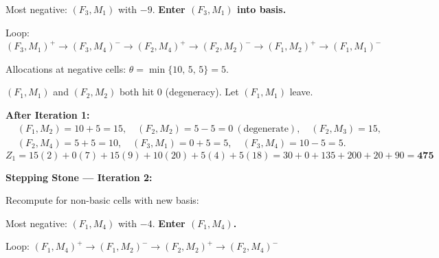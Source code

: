 \documentclass[12pt]{article}
\begin{document}
\begin{ansbox}
Most negative: $(F_3,M_1)$ with $-9$. \textbf{Enter $(F_3,M_1)$ into basis.}

Loop: $(F_3,M_1)^+\to(F_3,M_4)^-\to(F_2,M_4)^+\to(F_2,M_2)^-\to(F_1,M_2)^+\to(F_1,M_1)^-$

Allocations at negative cells: $\theta = \min\{10,\,5,\,5\} = 5$.

$(F_1,M_1)$ and $(F_2,M_2)$ both hit 0 (degeneracy). Let $(F_1,M_1)$ leave.

\textbf{After Iteration 1:}
\begin{align*}
  &(F_1,M_2)=10+5=15,\quad(F_2,M_2)=5-5=0\ (\text{degenerate}),\quad(F_2,M_3)=15,\\
  &(F_2,M_4)=5+5=10,\quad(F_3,M_1)=0+5=5,\quad(F_3,M_4)=10-5=5.
\end{align*}
\[
  Z_1 = 15(2)+0(7)+15(9)+10(20)+5(4)+5(18) = 30+0+135+200+20+90 = \mathbf{475}
\]

\medskip
\textbf{Stepping Stone — Iteration 2:}

Recompute for non-basic cells with new basis:

\begin{center}
\end{center}

Most negative: $(F_1,M_4)$ with $-4$. \textbf{Enter $(F_1,M_4)$.}

Loop: $(F_1,M_4)^+\to(F_1,M_2)^-\to(F_2,M_2)^+\to(F_2,M_4)^-$


\end{ansbox}
\end{document}
